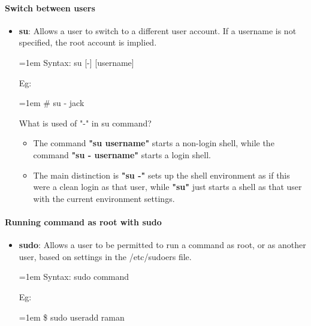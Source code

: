 \begin{flushleft}
\paragraph{Switch between users}
\begin{itemize}
	\item \textbf{su}: Allows a user to switch to a different user account. If a username is not specified, the root account is implied.
		\begin{tcolorbox}[breakable,notitle,boxrule=0pt,colback=pink,colframe=pink]
		\color{black}
		\font=1em
		Syntax: su [-] [username]
		\font=4pt
	\end{tcolorbox}
	Eg:
	\bigskip
	\begin{tcolorbox}[breakable,notitle,boxrule=-0pt,colback=black,colframe=black]
		\color{green}
		\font=1em
		\# su - jack
		\font=4pt
	\end{tcolorbox}
	What is used of "-" in su command?
	\begin{itemize}
		\item The command \textbf{"su username"} starts a non-login shell, while the command \textbf{"su - username"} starts a login shell. 
		\item The main distinction is \textbf{"su -"} sets up the shell environment as if this were a clean login as that user, while \textbf{"su"} just starts a shell as that user with the current environment settings.
	\end{itemize}
\end{itemize}

\paragraph{Running command as root with sudo}
\begin{itemize}
	\item \textbf{sudo}: Allows a user to be permitted to run a command as root, or as another user,
	based on settings in the /etc/sudoers file.
	\begin{tcolorbox}[breakable,notitle,boxrule=0pt,colback=pink,colframe=pink]
		\color{black}
		\font=1em
		Syntax: sudo command
		\font=4pt
	\end{tcolorbox}
	Eg:
	\bigskip
	\begin{tcolorbox}[breakable,notitle,boxrule=-0pt,colback=black,colframe=black]
		\color{green}
		\font=1em
		\$ sudo useradd raman
		\font=4pt
	\end{tcolorbox}
\end{itemize}


\end{flushleft}

